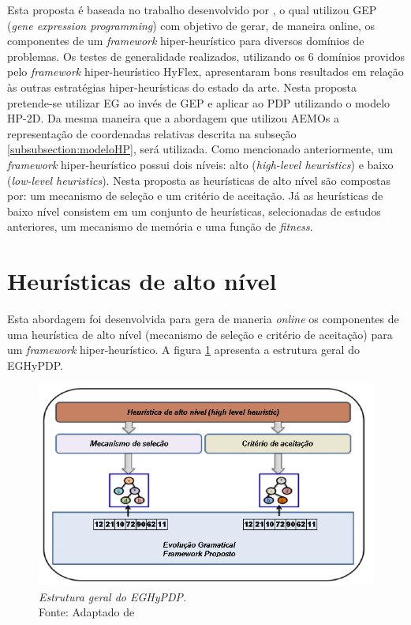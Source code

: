 Esta proposta é baseada no trabalho desenvolvido por \cite{sabar2015automatic}, o qual  utilizou GEP (\textit{gene expression programming}) com objetivo de gerar, de maneira online, os componentes de um \textit{framework} hiper-heurístico para diversos domínios de problemas. Os testes de generalidade realizados, utilizando os 6 domínios providos pelo \textit{framework} hiper-heurístico HyFlex, apresentaram bons resultados em relação às outras estratégias hiper-heurísticas do estado da arte. Nesta proposta pretende-se utilizar EG ao invés de GEP e aplicar ao PDP utilizando o modelo HP-2D. Da mesma maneira que a abordagem que utilizou  AEMOs a representação de coordenadas relativas descrita na subseção \ref{subsubsection:modeloHP}, será utilizada. Como mencionado anteriormente, um \textit{framework} hiper-heurístico possui dois níveis: alto (\textit{high-level heuristics}) e baixo (\textit{low-level heuristics}). Nesta proposta as heurísticas de alto nível são compostas por: um mecanismo de seleção e um critério de aceitação. Já as heurísticas de baixo nível consistem em um conjunto de heurísticas, selecionadas de estudos anteriores, um mecanismo de memória e uma função de \textit{fitness}. 

\section{Heurísticas de alto nível}
\label{sec:highlevelheuristics}
Esta abordagem  foi desenvolvida para gera de maneria \textit{online} os componentes de uma heurística de alto nível (mecanismo de seleção e critério de aceitação) para um \textit{framework} hiper-heurístico. A figura \ref{fig:proposedFramework} apresenta a estrutura geral do EGHyPDP. 

\begin{figure}[!htb]
	\centering
	\includegraphics[scale=.98]{Imagens/proposedFramework.png}
	\caption{ \textit{Estrutura geral do EGHyPDP.} \\ Fonte: Adaptado de \cite{sabar2015automatic}}
	\label{fig:proposedFramework}
\end{figure}


